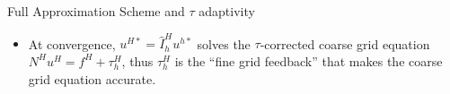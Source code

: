\documentclass[final,t]{beamer}
\begin{document}
\begin{frame}{}
\begin{columns}
\begin{column}{0.31\textwidth}
\begin{block}{Full Approximation Scheme and $\tau$ adaptivity}
\begin{itemize}
\begin{tabular}{llll}
            \bottomrule
          \end{tabular}
        \item At convergence, $u^{H*} = \hat I_h^H u^{h*}$ solves the $\tau$-corrected coarse grid equation
            $N^H u^H = f^H + \tau_h^H$,
          thus $\tau_h^H$ is the ``fine grid feedback'' that makes the coarse grid equation accurate.
        \end{itemize}
      \end{block}



\end{column}
\end{columns}
\end{frame}
\end{document}
